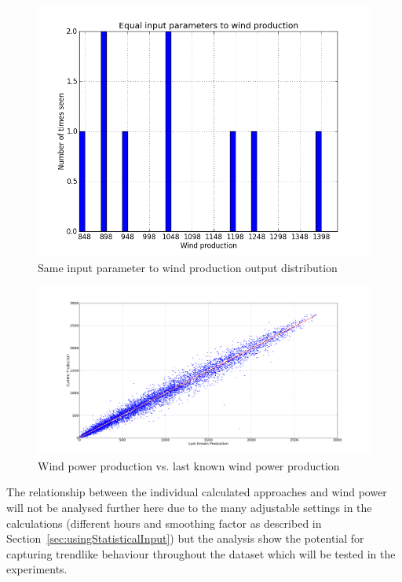 \begin{figure}[H]
\centering
\includegraphics[width=0.99\linewidth,natwidth=898,natheight=587]{billeder/Equal_wind.png}
\caption{Same input parameter to wind production output distribution}
\label{fig:inputParameterDistribution}
\end{figure}

\begin{figure}[H]
\centering
\includegraphics[width=0.99\linewidth,natwidth=898,natheight=587]{billeder/windProductionVsLastWindProduction.png}
\caption{Wind power production vs. last known wind power production}
\label{fig:windProductionVsLastWindProduction}
\end{figure}

\noindent The relationship between the individual calculated approaches and wind power will not be analysed further here due to the many adjustable settings in the calculations (different hours and smoothing factor as described in Section~\ref{sec:usingStatisticalInput}) but the analysis show the potential for capturing trendlike behaviour throughout the dataset which will be tested in the experiments.

